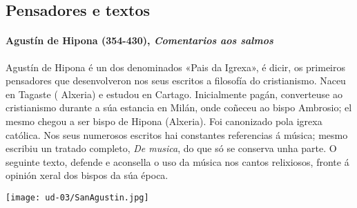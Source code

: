 %
%
\begin{multicols}{2}
%
\subsection*{Pensadores e textos}\label{pensadores-textos}
%
\paragraph{\texorpdfstring{Agustín de Hipona (354-430), \emph{Comentarios
aos salmos}}{Agustín de Hipona (354-430), Comentarios aos salmos}}\label{agustuxedn-de-hipona-354-430--comentarios-aos-salmos}
%
%
Agustín de Hipona é un dos denominados «Pais da Igrexa», é dicir, os primeiros pensadores que desenvolveron nos seus escritos a filosofía do cristianismo. Naceu en Tagaste ( Alxeria) e estudou en Cartago. Inicialmente pagán, converteuse ao cristianismo durante a súa estancia en Milán, onde coñeceu ao bispo Ambrosio; el mesmo chegou a ser bispo de Hipona (Alxeria). Foi canonizado pola igrexa católica. 
Nos seus numerosos escritos hai constantes referencias á música; mesmo escribiu un tratado completo, \emph{De musica}, do que só se conserva unha parte. O seguinte texto, defende e aconsella o uso da música nos cantos relixiosos, fronte á opinión xeral dos bispos da súa época.
%
%
\begin{Figura}
  \centering
  \texttt{[image: ud-03/SanAgustin.jpg]}
  \label{fig:San-Agustin}
\end{Figura}
%
\end{multicols}
%
